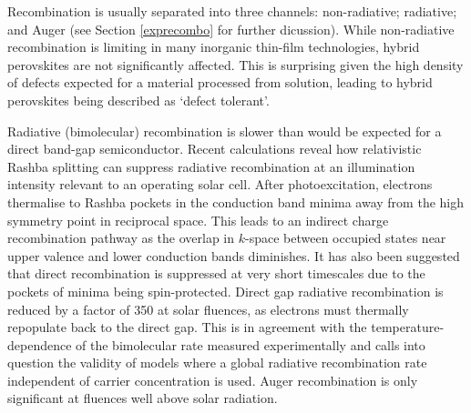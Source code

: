 Recombination is usually separated into three channels: 
non-radiative; radiative; and Auger (see Section \ref{exprecombo} for further dicussion). While non-radiative recombination is limiting in many inorganic thin-film technologies, hybrid perovskites are not significantly affected. 
This is surprising given the high density of defects expected
for a material processed from solution, leading to hybrid perovskites being described as `defect tolerant'. \autocite{Berry2016}

%

Radiative (bimolecular) recombination is slower than would be expected for a direct band-gap semiconductor. 
%
Recent calculations reveal how relativistic Rashba splitting can suppress radiative recombination at an illumination intensity relevant to an operating solar cell.\autocite{Azarhoosh2016, Zheng2015} 
After photoexcitation, electrons thermalise to Rashba pockets in the conduction band minima away from the high symmetry point in reciprocal space.
This leads to an indirect charge recombination pathway as the overlap in $k$-space between occupied states near upper valence and lower conduction bands diminishes.
It has also been suggested that direct recombination is suppressed at very short timescales due to the pockets of minima being spin-protected.\autocite{Zheng2015}
Direct gap radiative recombination is reduced by a factor of 350 at solar fluences, as electrons must thermally repopulate back to the direct gap.\autocite{Azarhoosh2016}
This is in agreement with the temperature-dependence of the bimolecular rate measured experimentally \autocite{Hutter2016a} and calls into question the validity of models where a global radiative recombination rate independent of carrier concentration is used.
Auger recombination is only significant at fluences well above solar radiation. 

